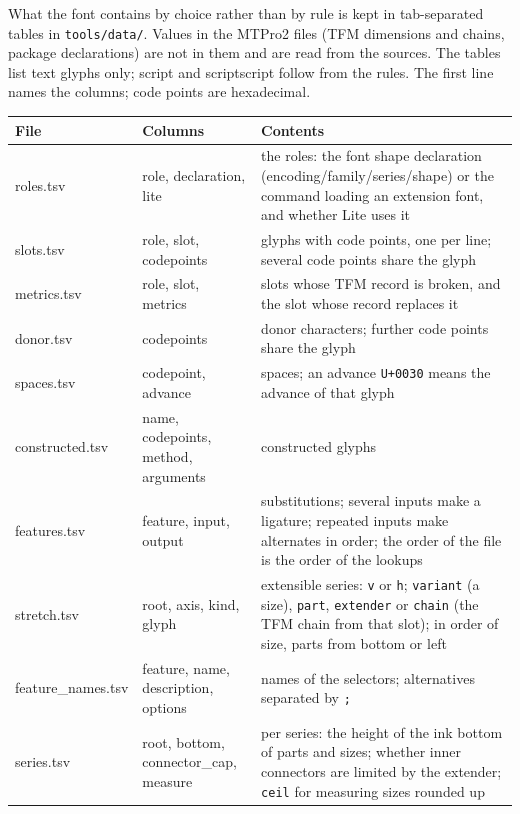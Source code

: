 \documentclass[10pt]{article}
\newcommand\file[1]{\texttt{#1}}
\newcommand\code[1]{\texttt{#1}}
\begin{document}
What the font contains by choice rather than by rule is kept in
tab-separated tables in \file{tools/data/}.  Values in the MTPro2 files
(TFM dimensions and chains, package declarations) are not in them and
are read from the sources.  The tables list text glyphs only; script
and scriptscript follow from the rules.  The first line names the
columns; code points are hexadecimal.

\begin{longtable}{>{\ttfamily}l>{\ttfamily}p{}p{}}
\toprule
\normalfont File & \normalfont Columns & Contents \\
\midrule
\endhead
roles.tsv & role, declaration, lite & the roles: the font shape
  declaration (encoding/family/series/shape) or the command loading an
  extension font, and whether Lite uses it \\
slots.tsv & role, slot, codepoints & glyphs with code points, one per
  line; several code points share the glyph \\
metrics.tsv & role, slot, metrics & slots whose TFM record is broken,
  and the slot whose record replaces it \\
donor.tsv & codepoints & donor characters; further code points share
  the glyph \\
spaces.tsv & codepoint, advance & spaces; an advance \code{U+0030}
  means the advance of that glyph \\
constructed.tsv & name, codepoints, method, arguments & constructed
  glyphs \\
features.tsv & feature, input, output & substitutions; several inputs
  make a ligature; repeated inputs make alternates in order; the order
  of the file is the order of the lookups \\
stretch.tsv & root, axis, kind, glyph & extensible series: \code{v} or
  \code{h}; \code{variant} (a size), \code{part}, \code{extender} or
  \code{chain} (the TFM chain from that slot); in order of size, parts
  from bottom or left \\
feature\_names.tsv & feature, name, description, options & names of the
  selectors; alternatives separated by \code{;} \\
series.tsv & root, bottom, connector\_cap, measure & per series: the
  height of the ink bottom of parts and sizes; whether inner connectors
  are limited by the extender; \code{ceil} for measuring sizes rounded
  up \\
\bottomrule
\end{longtable}
\end{document}
